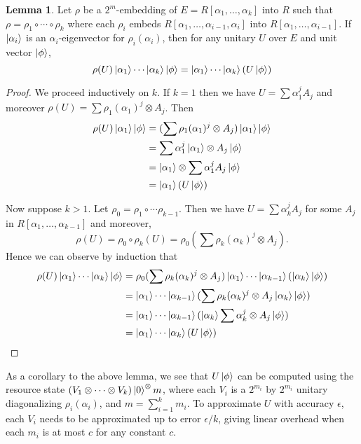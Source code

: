 \documentclass{article}
\theoremstyle{definition}
\theoremstyle{theorem}
\newtheorem{lemma}{Lemma}
\theoremstyle{remark}
\begin{document}
\begin{lemma}
Let $\rho$ be a $2^m$-embedding of $E=R[\alpha_1,\dots,\alpha_{k}]$ into $R$ such that $\rho=\rho_1\circ\cdots\circ\rho_k$ where each $\rho_i$ embeds $R[\alpha_1,\dots,\alpha_{i-1},\alpha_{i}]$ into $R[\alpha_1,\dots,\alpha_{i-1}]$. If $\ket{\alpha_i}$ is an $\alpha_i$-eigenvector for $\rho_i(\alpha_i)$, then for any unitary $U$ over $E$ and unit vector $\ket{\phi}$,
\[
	\rho(U)\ket{\alpha_1}\cdots\ket{\alpha_k}\ket{\phi} = \ket{\alpha_1}\cdots\ket{\alpha_k}(U\ket{\phi})
\]
\end{lemma}
\begin{proof}
We proceed inductively on $k$. If $k=1$ then we have $U = \sum \alpha_1^j A_{j}$ and moreover $\rho(U)=\sum\rho_1(\alpha_1)^j\otimes A_j$. Then
\begin{align*}
	\rho(U)\ket{\alpha_1}\ket{\phi}
		&=(\sum\rho_1(\alpha_1)^j\otimes A_j)\ket{\alpha_1}\ket{\phi} \\
		&=\sum \alpha_1^j\ket{\alpha_1}\otimes A_j\ket{\phi} \\
		&=\ket{\alpha_1}\otimes \sum \alpha_1^j A_j\ket{\phi} \\
		&=\ket{\alpha_1}(U\ket{\phi})
\end{align*}

Now suppose $k>1$. Let $\rho_0=\rho_1\circ\cdots\rho_{k-1}$. Then we have $U = \sum \alpha_k^j A_{j}$ for some $A_{j}$ in $R[\alpha_1,\dots,\alpha_{k-1}]$ and moreover, 
\[ 
	\rho(U)=\rho_0\circ\rho_k(U) = \rho_0(\sum\rho_k(\alpha_k)^j\otimes A_j).
\]
Hence we can observe by induction that
\begin{align*}
	\rho(U)\ket{\alpha_1}\cdots\ket{\alpha_k}\ket{\phi}
		&= \rho_0(\sum\rho_k(\alpha_k)^j\otimes A_j)\ket{\alpha_1}\cdots\ket{\alpha_{k-1}}(\ket{\alpha_k}\ket{\phi}) \\
		&= \ket{\alpha_1}\cdots\ket{\alpha_{k-1}}(\sum\rho_k(\alpha_k)^j\otimes A_j\ket{\alpha_k}\ket{\phi}) \\
		&=\ket{\alpha_1}\cdots\ket{\alpha_{k-1}}(\ket{\alpha_k}\sum\alpha_k^j\otimes A_j\ket{\phi}) \\
		&=\ket{\alpha_1}\cdots\ket{\alpha_k}(U\ket{\phi})
\end{align*}
\end{proof}

As a corollary to the above lemma, we see that $U\ket{\phi}$ can be computed using the resource state $(V_1\otimes\cdots\otimes V_k)\ket{0}^\otimes m$, where each $V_i$ is a $2^{m_i}$ by $2^{m_i}$ unitary diagonalizing $\rho_i(\alpha_i)$, and $m = \sum_{i=1}^k m_i$. To approximate $U$ with accuracy $\epsilon$, each $V_i$ needs to be approximated up to error $\epsilon/k$, giving linear overhead when each $m_i$ is at most $c$ for any constant $c$.
\end{document}
